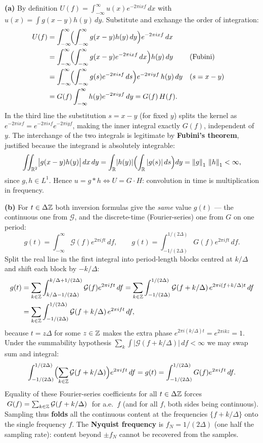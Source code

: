 \documentclass[11pt]{article}
\begin{document}
\textbf{(a)} By definition $U(f)=\int_{-\infty}^{\infty}u(x)e^{-2\pi i x f}\,dx$ with $u(x)=\int g(x-y)h(y)\,dy$. Substitute and exchange the order of integration:
\[
\begin{aligned}
U(f)
&=\int_{-\infty}^{\infty}\!\Bigl(\int_{-\infty}^{\infty}g(x-y)h(y)\,dy\Bigr)e^{-2\pi i x f}\,dx\\
&=\int_{-\infty}^{\infty}\!\Bigl(\int_{-\infty}^{\infty}g(x-y)e^{-2\pi i x f}\,dx\Bigr)h(y)\,dy
&&\text{(Fubini)}\\
&=\int_{-\infty}^{\infty}\!\Bigl(\int_{-\infty}^{\infty}g(s)e^{-2\pi i s f}\,ds\Bigr)e^{-2\pi i y f}\,h(y)\,dy
&&(s=x-y)\\
&=G(f)\int_{-\infty}^{\infty}h(y)e^{-2\pi i y f}\,dy=G(f)\,H(f).
\end{aligned}
\]
In the third line the substitution $s=x-y$ (for fixed $y$) splits the kernel as $e^{-2\pi i x f}=e^{-2\pi i s f}e^{-2\pi i y f}$, making the inner integral exactly $G(f)$, independent of $y$. The interchange of the two integrals is legitimate by \textbf{Fubini's theorem}, justified because the integrand is absolutely integrable:
\[
\iint_{\mathbb{R}^2}\bigl|g(x-y)h(y)\bigr|\,dx\,dy
=\int_{\mathbb{R}}\!|h(y)|\Bigl(\int_{\mathbb{R}}|g(s)|\,ds\Bigr)dy
=\left\lVert g \right\rVert_1\,\left\lVert h \right\rVert_1<\infty,
\]
since $g,h\in L^1$. Hence $u=g*h\Longleftrightarrow U=G\cdot H$: convolution in time is multiplication in frequency.

\textbf{(b)} For $t\in\Delta\mathbb{Z}$ both inversion formulas give the \emph{same} value $g(t)$ --- the continuous one from $\mathcal G$, and the discrete-time (Fourier-series) one from $G$ on one period:
\[
g(t)=\int_{-\infty}^{\infty}\mathcal G(f)e^{2\pi i f t}\,df,
\qquad
g(t)=\int_{-1/(2\Delta)}^{1/(2\Delta)}G(f)e^{2\pi i f t}\,df .
\]
Split the real line in the first integral into period-length blocks centred at $k/\Delta$ and shift each block by $-k/\Delta$:
\[
\begin{aligned}
g(t)
&=\sum_{k\in\mathbb{Z}}\int_{k/\Delta-1/(2\Delta)}^{k/\Delta+1/(2\Delta)}\mathcal G(f)e^{2\pi i f t}\,df
=\sum_{k\in\mathbb{Z}}\int_{-1/(2\Delta)}^{1/(2\Delta)}\mathcal G(f+k/\Delta)\,e^{2\pi i(f+k/\Delta)t}\,df\\
&=\sum_{k\in\mathbb{Z}}\int_{-1/(2\Delta)}^{1/(2\Delta)}\mathcal G(f+k/\Delta)\,e^{2\pi i f t}\,df,
\end{aligned}
\]
because $t=z\Delta$ for some $z\in\mathbb{Z}$ makes the extra phase $e^{2\pi i(k/\Delta)t}=e^{2\pi i kz}=1$. Under the summability hypothesis $\sum_k\int|\mathcal G(f+k/\Delta)|\,df<\infty$ we may swap sum and integral:
\[
\int_{-1/(2\Delta)}^{1/(2\Delta)}\Bigl(\sum_{k\in\mathbb{Z}}\mathcal G(f+k/\Delta)\Bigr)e^{2\pi i f t}\,df
=g(t)=\int_{-1/(2\Delta)}^{1/(2\Delta)}G(f)e^{2\pi i f t}\,df .
\]
Equality of these Fourier-series coefficients for all $t\in\Delta\mathbb{Z}$ forces $\;G(f)=\sum_{k\in\mathbb{Z}}\mathcal G(f+k/\Delta)\;$ for a.e.\ $f$ (and for all $f$, both sides being continuous). Sampling thus \textbf{folds} all the continuous content at the frequencies $\{f+k/\Delta\}$ onto the single frequency $f$. The \textbf{Nyquist frequency} is $f_N=1/(2\Delta)$ (one half the sampling rate): content beyond $\pm f_N$ cannot be recovered from the samples.
\end{document}
